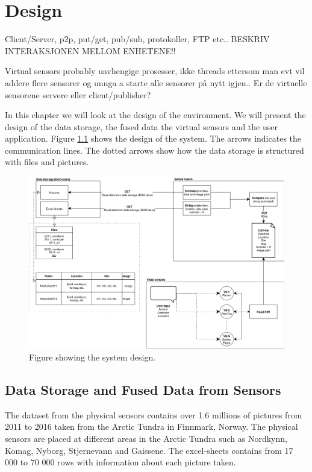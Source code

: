 \documentclass[USenglish]{uit-thesis}
\begin{document}
\chapter{Design}
Client/Server, p2p, put/get, pub/sub, protokoller, FTP etc..
BESKRIV INTERAKSJONEN MELLOM ENHETENE!!

Virtual sensors probably uavhengige prosesser, ikke threads ettersom man evt vil addere flere sensorer og unnga a starte alle sensorer på nytt igjen..
Er de virtuelle sensorene servere eller client/publisher?

In this chapter we will look at the design of the environment. We will present the design of the data storage, the fused data the virtual sensors and the user application. Figure \ref{fig:design} shows the design of the system. The arrows indicates the communication lines. The dotted arrows show how the data storage is structured with files and pictures.


\begin{figure}
\centering
\includegraphics[width=\textwidth]{Design.png}
\caption{Figure showing the system design.}
\label{fig:design}
\end{figure}

\section{Data Storage and Fused Data from Sensors} \label{ssec:des_fused}
The dataset from the physical sensors contains over 1.6 millions of pictures from 2011 to 2016 taken from the Arctic Tundra in Finnmark, Norway. The physical sensors are placed at different areas in the Arctic Tundra such as Nordkynn, Komag, Nyborg, Stjernevann and Gaissene.
The excel-sheets contains from 17 000 to 70 000 rows with information about each picture taken.
\end{document}

